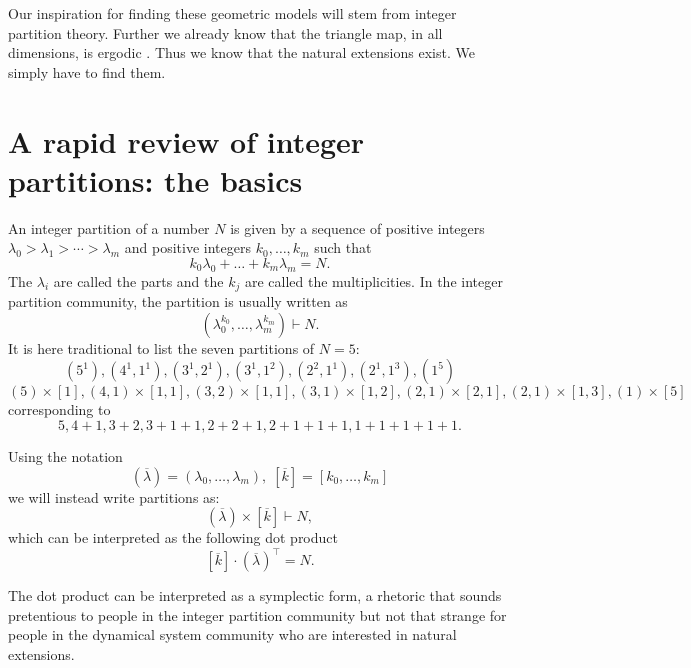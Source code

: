 \documentclass[12pt,oneside,openany]{article}
\begin{document}
Our inspiration for finding these geometric models will stem from integer partition theory.  Further we already know that the triangle map, in all dimensions, is ergodic  \cite{Garrity-Lehmann Duke}.  Thus we know that the natural extensions exist.  We simply have to find them.  





\section{A rapid review of integer partitions: the basics}\label{Partitions}

An integer partition of a number $N$ is given by a sequence of positive integers $\lambda_0>\lambda_1>\cdots > \lambda_m$ and positive integers $k_0, \ldots, k_m$ such that 
$$k_0 \lambda_0 + \ldots + k_m \lambda_m = N.$$
The $\lambda_i$ are called the parts and the $k_j$ are called the multiplicities.  In the integer partition community, the partition is usually written as 
$$(\lambda_0^{k_0}, \ldots, \lambda_m^{k_m}) \vdash N.$$
 It is here traditional to list the seven  partitions of $N=5$:
 $$(5^1), (4^1,1^1), (3^1,2^1),(3^1,1^2), (2^2,1^1), (2^1,1^3),  (1^5)$$
$$(5) \times [1], (4,1) \times [1,1], (3,2)\times [1,1], (3, 1) \times[1,2], (2,1) \times [2,1], (2,1) \times [1,3] , (1) \times [5]$$
corresponding to 
$$5, 4+1, 3+2, 3+1+1, 2+2+1, 2+1+1+1, 1+1+1+1+1.$$

Using the notation 
$$(\overline{\lambda})= (\lambda_0, \ldots, \lambda_m), \; [\overline{k}] =[k_0, \ldots, k_m]$$
we will instead write partitions as:
$$(\overline{\lambda}) \times [ \overline{k}] \vdash N,$$
which can be interpreted as the following dot product
$$ [ \overline{k}]  \cdot (\overline{\lambda})^{\top}= N.$$

The dot product can be interpreted as a symplectic form, a rhetoric that sounds pretentious to people in the integer partition community but not that strange for people in the dynamical system community who are interested in natural extensions.  
\end{document}
